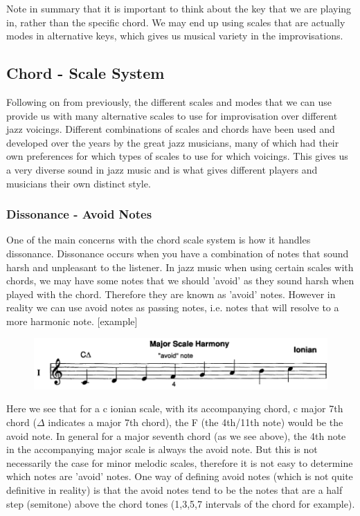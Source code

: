 \documentclass[pdftex,12pt,a4paper]{report}
\begin{document}
Note in summary that it is important to think about the key that we are playing in, rather than the specific chord. We may end up using scales that are actually modes in alternative keys, which gives us musical variety in the improvisations.

\subsection{Chord - Scale System}
Following on from previously, the different scales and modes that we can use provide us with many alternative scales to use for improvisation over different jazz voicings. Different combinations of scales and chords have been used and developed over the years by the great jazz musicians, many of which had their own preferences for which types of scales to use for which voicings. This gives us a very diverse sound in jazz music and is what gives different players and musicians their own distinct style. 

\subsubsection{Dissonance - Avoid Notes}
One of the main concerns with the chord scale system is how it handles dissonance. Dissonance occurs when you have a combination of notes that sound harsh and unpleasant to the listener. In jazz music when using certain scales with chords, we may have some notes that we should 'avoid' as they sound harsh when played with the chord. Therefore they are known as 'avoid' notes. However in reality we can use avoid notes as passing notes, i.e. notes that will resolve to a more harmonic note. [example]

\begin{figure}[here]
  \centering
  \includegraphics[scale=0.4]{figure/cionian.png}
  \label{fig:cionian}
\end{figure}

Here we see that for a c ionian scale, with its accompanying chord, c major 7th chord ($\Delta$ indicates a major 7th chord), the F (the 4th/11th note) would be the avoid note.  In general for a major seventh chord (as we see above), the 4th note in the accompanying major scale is always the avoid note. But this is not necessarily the case for minor melodic scales, therefore it is not easy to determine which notes are 'avoid' notes. One way of defining avoid notes (which is not quite definitive in reality) is that the avoid notes tend to be the notes that are a half step (semitone) above the chord tones (1,3,5,7 intervals of the chord for example).
\end{document}
